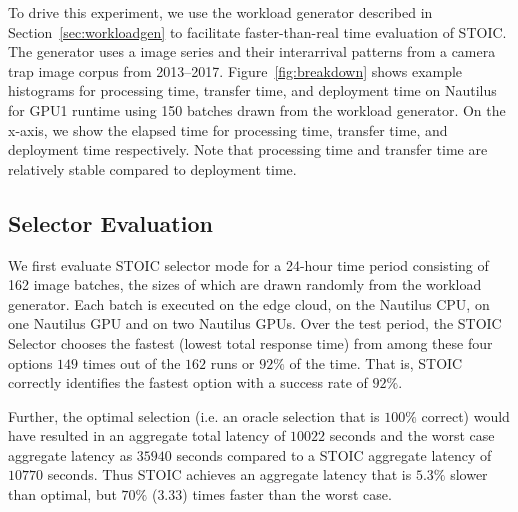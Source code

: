To drive this experiment, we use the workload generator
described in Section~\ref{sec:workloadgen} to facilitate faster-than-real
time evaluation of STOIC. The generator uses a image series and their
interarrival patterns from
a camera trap image corpus from 2013--2017.
Figure~\ref{fig:breakdown} shows 
example histograms for processing time, transfer time, and deployment time on
Nautilus for GPU1 runtime using 150 batches drawn from the workload generator.
On the x-axis, we show the elapsed time for processing time, transfer time, and
deployment time respectively.  Note that processing time and transfer time are
relatively stable compared to deployment time. 

\subsection{Selector Evaluation}

We first evaluate STOIC selector mode for a 24-hour time period consisting of 162
image batches, the sizes of which are drawn randomly from the workload generator. Each
batch is executed on the edge cloud, on the Nautilus CPU, on one Nautilus GPU
and on two Nautilus GPUs. Over the test period, the STOIC Selector chooses the
fastest (lowest total response time) from among these four options $149$ times
out of the $162$ runs or $92\%$ of the time. That is, STOIC correctly
identifies the fastest option with a success rate of $92\%$.

Further, the optimal selection (i.e. an oracle selection that is $100\%$
correct) would have resulted in an aggregate total latency of $10022$ seconds
and the worst case aggregate latency as $35940$ seconds compared to a STOIC
aggregate latency of $10770$ seconds.  Thus STOIC achieves an aggregate
latency that is $5.3\%$ slower than optimal, but $70\%$ ($3.33$) times faster
than the worst case. %

%

